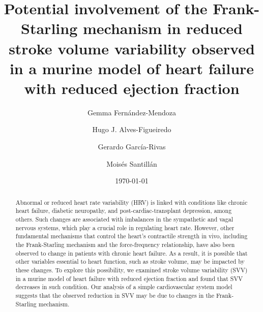 \documentclass[%
preprint,
 amsmath,amssymb,
 aps,
]{revtex4-2}
\begin{document}
\preprint{}

\title{Potential involvement of the Frank-Starling mechanism in reduced stroke volume variability observed in a murine model of heart failure with reduced ejection fraction}%

\author{Gemma Fernández-Mendoza}
%

\author{Hugo J. Alves-Figueiredo}
%

\author{Gerardo García-Rivas}
%

\author{Moisés Santillán}
%

\date{\today}%

\begin{abstract}
Abnormal or reduced heart rate variability (HRV) is linked with conditions like chronic heart failure, diabetic neuropathy, and post-cardiac-transplant depression, among others. Such changes are associated with imbalances in the sympathetic and vagal nervous systems, which play a crucial role in regulating heart rate. However, other fundamental mechanisms that control the heart's contractile strength in vivo, including the Frank-Starling mechanism and the force-frequency relationship, have also been observed to change in patients with chronic heart failure. As a result, it is possible that other variables essential to heart function, such as stroke volume, may be impacted by these changes. To explore this possibility, we examined stroke volume variability (SVV) in a murine model of heart failure with reduced ejection fraction and found that SVV decreases in such condition. Our analysis of a simple cardiovascular system model suggests that the observed reduction in SVV may be due to changes in the Frank-Starling mechanism.
\end{abstract}
\end{document}
